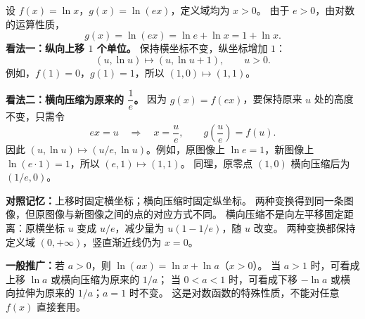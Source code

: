 \begin{explanationbox}
  设 $f(x)=\ln x$，$g(x)=\ln(ex)$，定义域均为 $x>0$。
  由于 $e>0$，由对数的运算性质，
  \[
    g(x)=\ln(ex)=\ln e+\ln x=1+\ln x.
  \]
  \textbf{看法一：纵向上移 $1$ 个单位。}
  保持横坐标不变，纵坐标增加 $1$：
  \[
    (u,\ln u)\longmapsto (u,\ln u+1),\qquad u>0.
  \]
  例如，$f(1)=0$，$g(1)=1$，所以 $(1,0)\longmapsto(1,1)$。

  \textbf{看法二：横向压缩为原来的 $\dfrac1e$。}
  因为 $g(x)=f(ex)$，要保持原来 $u$ 处的高度不变，只需令
  \[
    ex=u\quad\Longrightarrow\quad x=\frac{u}{e},
    \qquad g\left(\frac{u}{e}\right)=f(u).
  \]
  因此 $(u,\ln u)\longmapsto (u/e,\ln u)$。例如，原图像上
  $\ln e=1$，新图像上 $\ln(e\cdot1)=1$，所以 $(e,1)\longmapsto(1,1)$。
  同理，原零点 $(1,0)$ 横向压缩后为 $(1/e,0)$。
  \begin{center}
    
  \end{center}
  \textbf{对照记忆：}上移时固定横坐标；横向压缩时固定纵坐标。
  两种变换得到同一条图像，但原图像与新图像之间的点的对应方式不同。
  横向压缩不是向左平移固定距离：原横坐标 $u$ 变成 $u/e$，减少量为 $u(1-1/e)$，随 $u$ 改变。
  两种变换都保持定义域 $(0,+\infty)$，竖直渐近线仍为 $x=0$。

  \textbf{一般推广：}若 $a>0$，则 $\ln(ax)=\ln x+\ln a$（$x>0$）。
  当 $a>1$ 时，可看成上移 $\ln a$ 或横向压缩为原来的 $1/a$；
  当 $0<a<1$ 时，可看成下移 $-\ln a$ 或横向拉伸为原来的 $1/a$；$a=1$ 时不变。
  这是对数函数的特殊性质，不能对任意 $f(x)$ 直接套用。

\end{explanationbox}
